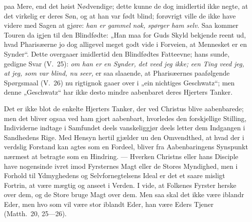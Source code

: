 \documentclass[12pt,a4paper]{book}
\begin{document}
paa Mere, end det høist Nødvendige; dette kunne de dog imidlertid ikke negte, at det
virkelig er deres Søn, og at han var født blind; forøvrigt ville de ikke have videre med
Sagen at gjøre: \emph{han er gammel nok, spørger ham selv.} Saa kommer Touren da igjen til
den Blindfødte: „Han maa for Guds Skyld bekjende reent ud, hvad Pharisæerne jo dog
alligevel meget godt vide i Forveien, at Mennesket er en Synder“. Dette overgaaer
imidlertid den Blindfødtes Fatteevne; hans sunde, gedigne Svar (V.\ 25): \emph{om han er
en Synder, det veed jeg ikke; een Ting veed jeg, at jeg, som var blind, nu seer,} er saa
slaaende, at Pharisæernes paafølgende Spørgsmaal (V.\ 26) nu rigtignok gaaer over i „ein
nichtiges Geschwatz“; men denne „Geschwatz“ har ikke desto mindre aabenbaret deres
Hjerters Tanker.

Det er ikke blot de enkelte Hjerters Tanker, der ved Christus blive aabenbarede; men det
bliver ogsaa ved ham gjort aabenbart, hvorledes den forskjellige Stilling, Individerne
indtage i Samfundet deels vanskeliggjør deels letter dem Indgangen i Sandhedens Rige. Med
Hensyn hertil gjælder uu den Omvendthed, at hvad der i verdslig Forstand kan agtes som en
Fordeel, bliver fra Aabenbaringens Synspunkt nærmest at betragte som en Hindring. ---
Hverken Christns eller hans Disciple have nogensinde ivret
imod Fyrsternes Magt eller de Stores Myndighed, men i Forhold til Ydmyghedens og
Selvfornegtelsens Ideal er det et saare misligt Fortrin, at være mægtig og anseet i
Verden. {\large I vide, at Folkenes Fyrster herske over dem, og de Store bruge Magt over
dem. Men saa skal det ikke være iblandr Eder, men hvo som vil være stor iblandt Eder, han
være Eders Tjener (Matth.\ 20, 25---26).}
\end{document}
